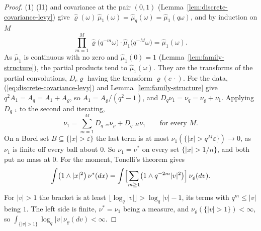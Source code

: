 \begin{proof}
(1) (I1) and covariance at the pair $(0, 1)$ (Lemma~\ref{lem:discrete-covariance-levy}) give
$\widehat\varrho(\omega)\,\widehat\mu_1(\omega) = \widehat\mu_q(\omega) = \widehat\mu_1(q\omega)$, and by
induction on $M$
\[
  \prod_{m=1}^{M}\widehat\varrho\bigl(q^{-m}\omega\bigr)\cdot\widehat\mu_1\bigl(q^{-M}\omega\bigr)
  = \widehat\mu_1(\omega).
\]
As $\widehat\mu_1$ is continuous with no zero and $\widehat\mu_1(0) = 1$
(Lemma~\ref{lem:family-structure}), the partial products tend to $\widehat\mu_1(\omega)$. They are the
transforms of the partial convolutions, $D_c\varrho$ having the transform $\widehat\varrho(c\,\cdot)$.
For the data, (\ref{eq:discrete-covariance-levy}) and Lemma~\ref{lem:family-structure} give
$q^2A_1 = A_q = A_1 + A_\varrho$, so $A_1 = A_\varrho/(q^2 - 1)$, and
$D_q\nu_1 = \nu_q = \nu_\varrho + \nu_1$. Applying $D_{q^{-1}}$
to the second and iterating,
\[
  \nu_1 = \sum_{m=1}^{M}D_{q^{-m}}\nu_\varrho + D_{q^{-M}}\nu_1 \qquad\text{for every } M.
\]
On a Borel set $B \subseteq \{|x| > \varepsilon\}$ the last term is at most
$\nu_1(\{|x| > q^M\varepsilon\}) \to 0$, as $\nu_1$ is finite off every ball about $0$. So
$\nu_1 = \nu^*$ on every set $\{|x| > 1/n\}$, and both put no mass at $0$. For the moment,
Tonelli's theorem gives
\begin{equation}
\label{eq:ladder-tonelli}
  \int\bigl(1 \wedge |x|^2\bigr)\,\nu^*(dx) = \int\Bigl[\sum_{m \ge 1}\bigl(1 \wedge q^{-2m}|v|^2\bigr)\Bigr]\,\nu_\varrho(dv).
\end{equation}
For $|v| > 1$ the bracket is at least $\lfloor\log_q|v|\rfloor > \log_q|v| - 1$, its terms with
$q^m \le |v|$ being $1$. The left side is finite, $\nu^* = \nu_1$ being a \Levy{} measure, and
$\nu_\varrho(\{|v| > 1\}) < \infty$, so $\int_{\{|v| > 1\}}\log_q|v|\,\nu_\varrho(dv) < \infty$.


\end{proof}
